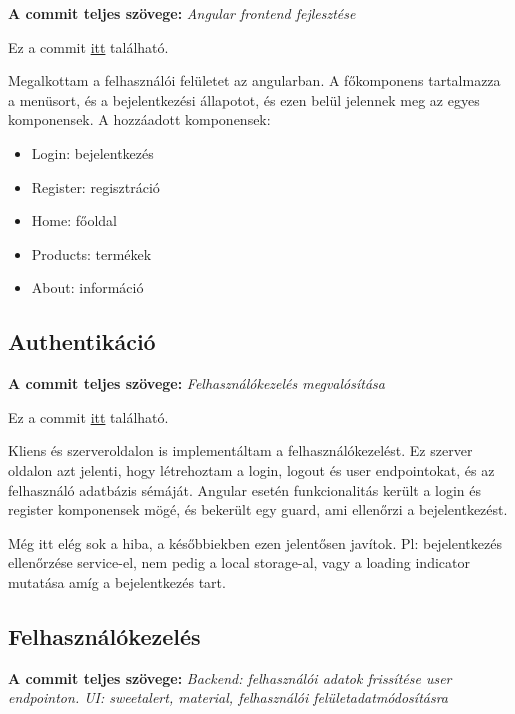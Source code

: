 \documentclass[]{article}
\begin{document}
\noindent
\textbf{A commit teljes szövege:} \textit{Angular frontend fejlesztése}

\bigskip
\noindent
Ez a commit \href{https://github.com/Gtomika/prf-project/commit/53e7acb28718a72afb40870192a166d8839e0d08}{itt} található.
\bigskip

Megalkottam a felhasználói felületet az angularban. A főkomponens tartalmazza a menüsort, és a bejelentkezési állapotot, és ezen belül jelennek meg az egyes komponensek. A hozzáadott komponensek:

\begin{itemize}
	\item Login: bejelentkezés
	\item Register: regisztráció
	\item Home: főoldal
	\item Products: termékek
	\item About: információ
\end{itemize}

\subsection{Authentikáció}

\noindent
\textbf{A commit teljes szövege:} \textit{Felhasználókezelés megvalósítása}

\bigskip
\noindent
Ez a commit \href{https://github.com/Gtomika/prf-project/commit/ac23392a3ebe9a36ad80a358ebb768bba0434b408}{itt} található.
\bigskip

Kliens és szerveroldalon is implementáltam a felhasználókezelést. Ez szerver oldalon azt jelenti, hogy létrehoztam a login, logout és user endpointokat, és az felhasználó adatbázis sémáját. Angular esetén funkcionalitás került a login és register komponensek mögé, és bekerült egy guard, ami ellenőrzi a bejelentkezést.

Még itt elég sok a hiba, a későbbiekben ezen jelentősen javítok. Pl: bejelentkezés ellenőrzése service-el, nem pedig a local storage-al, vagy a loading indicator mutatása amíg a bejelentkezés tart.

\subsection{Felhasználókezelés}

\noindent
\textbf{A commit teljes szövege:} \textit{ Backend: felhasználói adatok frissítése user endpointon. UI: sweetalert, material, felhasználói felületadatmódosításra}
\end{document}
